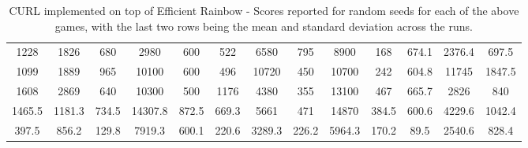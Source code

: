 \documentclass{article}
\begin{document}
\begin{table*}[!ht]
\begin{tabular}{c|c|c|c|c|c|c|c|c|c|c|c|c}
1228 &	1826 &	680 &	2980 &	600 &	522 &	6580 &	795 &	8900 &	168 &	674.1 &	2376.4 &	697.5  \\
1099 &	1889 &	965 &	10100 &	600 &	496 &	10720 &	450 &	10700 &	242 &	604.8 &	11745 &	1847.5 \\
1608 &	2869	 & 640 &	10300  & 500 &	1176 &	4380 &	355 &	13100 &	467 &	665.7 &	2826 &	840  \\
\hline
1465.5 &	1181.3 &	734.5 &	14307.8 &	872.5 &	669.3 &	5661 &	471 &	14870 &	384.5 &	600.6 &	4229.6 &	1042.4  \\ 
\hline
397.5 &	856.2 &	129.8 &	7919.3 &	600.1 &	220.6 &	3289.3 &	226.2 &	5964.3 &	170.2  & 89.5 &	2540.6 & 828.4 \\
\hline
\end{tabular}
\vspace*{-0mm}
\caption{CURL implemented on top of Efficient Rainbow - Scores reported for  random seeds for each of the above games, with the last two rows being the mean and standard deviation across the runs.}
\label{tab:atari1}
\vspace{-2mm}
\end{table*}
\end{document}
